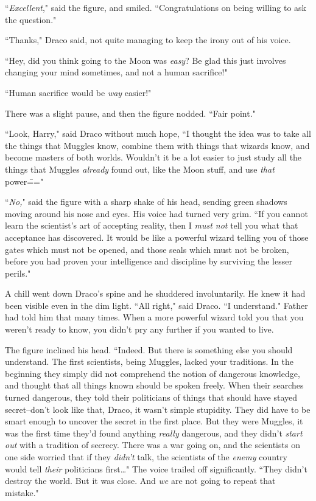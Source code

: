 ``\emph{Excellent}," said the figure, and smiled. ``Congratulations on being willing to ask the question."

``Thanks," Draco said, not quite managing to keep the irony out of his voice.

``Hey, did you think going to the Moon was \emph{easy}? Be glad this just involves changing your mind sometimes, and not a human sacrifice!"

``Human sacrifice would be \emph{way} easier!"

There was a slight pause, and then the figure nodded. ``Fair point."

``Look, Harry," said Draco without much hope, ``I thought the idea was to take all the things that Muggles know, combine them with things that wizards know, and become masters of both worlds. Wouldn't it be a lot easier to just study all the things that Muggles \emph{already} found out, like the Moon stuff, and use \emph{that} power\==="

``\emph{No,}" said the figure with a sharp shake of his head, sending green shadows moving around his nose and eyes. His voice had turned very grim. ``If you cannot learn the scientist's art of accepting reality, then I \emph{must not} tell you what that acceptance has discovered. It would be like a powerful wizard telling you of those gates which must not be opened, and those seals which must not be broken, before you had proven your intelligence and discipline by surviving the lesser perils."

A chill went down Draco's spine and he shuddered involuntarily. He knew it had been visible even in the dim light. ``All right," said Draco. ``I understand." Father had told him that many times. When a more powerful wizard told you that you weren't ready to know, you didn't pry any further if you wanted to live.

The figure inclined his head. ``Indeed. But there is something else you should understand. The first scientists, being Muggles, lacked your traditions. In the beginning they simply did not comprehend the notion of dangerous knowledge, and thought that all things known should be spoken freely. When their searches turned dangerous, they told their politicians of things that should have stayed secret\---don't look like that, Draco, it wasn't simple stupidity. They did have to be smart enough to uncover the secret in the first place. But they were Muggles, it was the first time they'd found anything \emph{really} dangerous, and they didn't \emph{start out} with a tradition of secrecy. There was a war going on, and the scientists on one side worried that if they \emph{didn't} talk, the scientists of the \emph{enemy} country would tell \emph{their} politicians first{\ldots}" The voice trailed off significantly. ``They didn't destroy the world. But it was close. And \emph{we} are not going to repeat that mistake."

